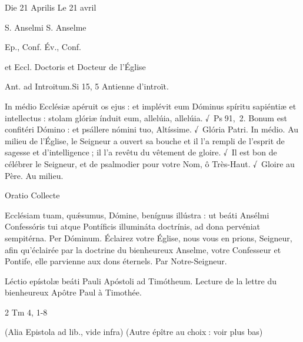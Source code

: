 \begin{paracol}{2}

Die 21 Aprilis
\switchcolumn
Le 21 avril
\switchcolumn*

S. Anselmi
\switchcolumn
S. Anselme
\switchcolumn*

Ep., Conf.
\switchcolumn
Év., Conf.
\switchcolumn*

et Eccl. Doctoris
\switchcolumn
et Docteur de l’Église
\switchcolumn*

Ant. ad Introitum.\hfill Si 15, 5
\switchcolumn
Antienne d’introït.
\switchcolumn*

In médio Ecclésiæ apéruit os ejus :  et implévit eum Dóminus spíritu sapiéntiæ et intellectus : stolam glóriæ índuit eum, allelúia, allelúia. √~Ps 91, 2. Bonum est confitéri Dómino : et psállere nómini tuo, Altíssime. √~Glória Patri. In médio.
\switchcolumn
Au milieu de l’Église, le Seigneur a ouvert sa bouche et il l’a rempli de l’esprit de sagesse et d’intelligence ; il l’a revêtu du vêtement de gloire. √~Il est bon de célébrer le Seigneur, et de psalmodier pour votre Nom, ô Très-Haut. √~Gloire au Père. Au milieu.
\switchcolumn*

Oratio
\switchcolumn
Collecte
\switchcolumn*

Ecclésiam tuam, quǽsumus,  Dómine, benígnus illústra : ut beáti Ansélmi Confessóris tui atque Pontíficis illumináta doctrínis, ad dona pervéniat sempitérna. Per Dóminum.
\switchcolumn
Éclairez votre Église, nous vous en  prions, Seigneur, afin qu’éclairée par la doctrine du bienheureux Anselme, votre Confesseur et Pontife, elle parvienne aux dons éternels. Par Notre-Seigneur.
\switchcolumn*

Léctio epístolæ beáti Pauli Apóstoli ad Timótheum.
\switchcolumn
Lecture de la lettre du bienheureux Apôtre Paul à Timothée.
\switchcolumn*

2 Tm 4, 1-8
\switchcolumn

\switchcolumn*

(Alia Epistola ad lib., vide infra)
\switchcolumn
(Autre épître au choix : voir plus bas)
\switchcolumn*


\end{paracol}
